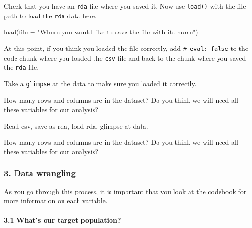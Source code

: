 \documentclass[
  letterpaper,
  DIV=11,
  numbers=noendperiod]{scrartcl}
\let\oldparagraph\paragraph
\renewcommand{\paragraph}[1]{\oldparagraph{#1}\mbox{}}
\newenvironment{Shaded}{\begin{snugshade}}{\end{snugshade}}
\newcommand{\AttributeTok}[1]{\textcolor[rgb]{0.40,0.45,0.13}{#1}}
\newcommand{\FunctionTok}[1]{\textcolor[rgb]{0.28,0.35,0.67}{#1}}
\newcommand{\NormalTok}[1]{\textcolor[rgb]{0.00,0.23,0.31}{#1}}
\newcommand{\StringTok}[1]{\textcolor[rgb]{0.13,0.47,0.30}{#1}}
\begin{document}
Check that you have an \texttt{rda} file where you saved it. Now use
\texttt{load()} with the file path to load the \texttt{rda} data here.

\begin{Shaded}
\begin{Highlighting}[]
\FunctionTok{load}\NormalTok{(}\AttributeTok{file =} \StringTok{"Where you would like to save the file with its name"}\NormalTok{)}
\end{Highlighting}
\end{Shaded}

At this point, if you think you loaded the file correctly, add
\texttt{\#\textbar{}\ eval:\ false} to the code chunk where you loaded
the \texttt{csv} file and back to the chunk where you saved the
\texttt{rda} file.

Take a \texttt{glimpse} at the data to make sure you loaded it
correctly.

How many rows and columns are in the dataset? Do you think we will need
all these variables for our analysis?

\begin{tcolorbox}[enhanced jigsaw, left=2mm, opacitybacktitle=0.6, arc=.35mm, colback=white, colframe=quarto-callout-important-color-frame, bottomrule=.15mm, opacityback=0, toptitle=1mm, toprule=.15mm, titlerule=0mm, colbacktitle=quarto-callout-important-color!10!white, rightrule=.15mm, leftrule=.75mm, title=\textcolor{quarto-callout-important-color}{\faExclamation}\hspace{0.5em}{Task Summary}, breakable, bottomtitle=1mm, coltitle=black]

Read csv, save as rda, load rda, glimpse at data.

How many rows and columns are in the dataset? Do you think we will need
all these variables for our analysis?

\end{tcolorbox}

\hypertarget{data-wrangling}{%
\subsubsection{3. Data wrangling}\label{data-wrangling}}

As you go through this process, it is important that you look at the
codebook for more information on each variable.

\hypertarget{whats-our-target-population}{%
\paragraph{3.1 What's our target
population?}\label{whats-our-target-population}}
\end{document}
